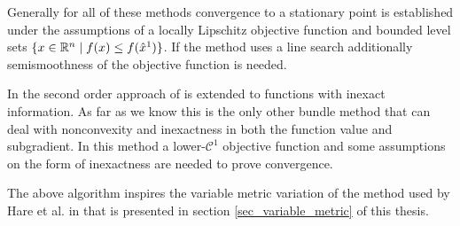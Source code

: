Generally for all of these methods convergence to a stationary point is established under the assumptions of a locally Lipschitz objective function and bounded level sets \(\{x \in \mathbb{R}^n \mid  f(x) \leq f(\hat{x}^1)\}\).
If the method uses a line search additionally semismoothness of the objective function is needed.

In \cite{Noll2013} the second order approach of \cite{Noll2012} is extended to functions with inexact information.
As far as we know this is the only other bundle method that can deal with nonconvexity and inexactness in both the function value and subgradient. In this method a lower-\(\mathcal{C}^1\) objective function and some assumptions on the form of inexactness are needed to prove convergence.

The above algorithm inspires the variable metric variation of the method used by Hare et al. in \cite{Hare2016} that is presented in section \ref{sec_variable_metric} of this thesis.


